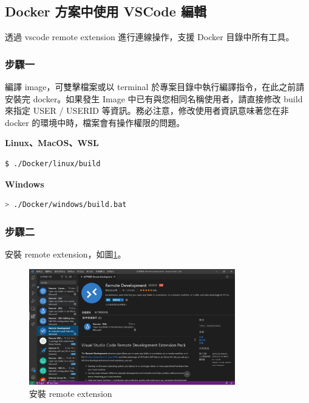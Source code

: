 \newpage

\subsection{Docker 方案中使用 VSCode 編輯}

透過 vscode remote extension 進行連線操作，支援 Docker 目錄中所有工具。

\subsubsection*{步驟一}
編譯 image，可雙擊檔案或以 terminal 於專案目錄中執行編譯指令，在此之前請安裝完 docker。如果發生 Image 中已有與您相同名稱使用者，請直接修改 build 來指定 USER / USERID 等資訊。務必注意，修改使用者資訊意味著您在非 docker 的環境中時，檔案會有操作權限的問題。

\begin{flushleft}
        \textbf{Linux、MacOS、WSL}
\end{flushleft}

\begin{lstlisting}[language=bash]
        $ ./Docker/linux/build
\end{lstlisting}

\begin{flushleft}
        \textbf{Windows}
\end{flushleft}

\begin{lstlisting}[language=bash]
        > ./Docker/windows/build.bat
\end{lstlisting}

\subsubsection*{步驟二}

安裝 remote extension，如圖\ref{fig_vscode_remote_extension}。

\begin{figure}[H] 
        \centering 
        \includegraphics[width=0.8\textwidth]{./Figures/Env/docker/vscode_remote_extension.png} 
        \caption{安裝 remote extension}
        \label{fig_vscode_remote_extension}
\end{figure}

